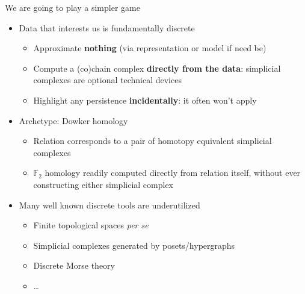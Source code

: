 \documentclass[usenames,dvipsnames,10pt,aspectratio=169]{beamer}
\begin{document}
\begin{frame}{We are going to play a simpler game}
	\begin{itemize}
		\item<1-> Data that interests us is fundamentally discrete
		\begin{itemize}
			\item<1-> {\color{CatCapGold}Approximate} {\bf nothing} (via representation or model if need be)
			\item<1-> {\color{CatCapGold}Compute} a (co)chain complex {\bf directly from the data}: simplicial complexes are optional technical devices
			\item<1-> {\color{CatCapGold}Highlight} any persistence {\bf incidentally}: it often won't apply
		\end{itemize}
		\item<2-> Archetype: Dowker homology
		\begin{itemize}
			\item<2-> Relation corresponds to a pair of homotopy equivalent simplicial complexes
			\item<2-> $\mathbb{F}_2$ homology readily computed directly from relation itself, without ever constructing either simplicial complex
		\end{itemize}
		\item<3-> Many well known discrete tools are underutilized
		\begin{itemize}
			\item<3-> Finite topological spaces \emph{per se}
			\item<3-> Simplicial complexes generated by posets/hypergraphs
			\item<3-> Discrete Morse theory
			\item<3-> \dots
		\end{itemize}
	\end{itemize}
\end{frame}
\end{document}
